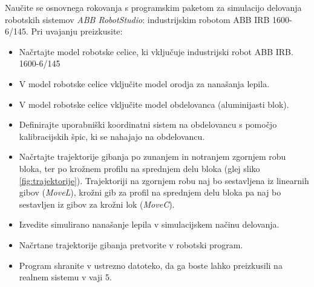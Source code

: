 Naučite se osnovnega rokovanja s programskim paketom za simulacijo delovanja
robotskih sistemov \emph{ABB RobotStudio}: industrijskim robotom ABB IRB
1600-6/145. Pri uvajanju preizkusite:
\begin{itemize}
\item\vspace*{-0.25cm} Načrtajte model robotske celice, ki vključuje industrijski robot ABB IRB.
1600-6/145

\item\vspace*{-0.25cm} V model robotske celice vključite model
orodja za nanašanja lepila.

\item\vspace*{-0.25cm} V model robotske celice vključite model
obdelovanca (aluminijasti blok).

\item\vspace*{-0.25cm} Definirajte uporabniški koordinatni sistem na obdelovancu s pomočjo kalibracijskih špic, ki se nahajajo na obdelovancu.

\item\vspace*{-0.25cm} Načrtajte trajektorije gibanja po zunanjem in notranjem zgornjem robu bloka, ter po krožnem profilu na sprednjem delu bloka (glej sliko \ref{fig:trajektorije}). Trajektoriji na zgornjem robu naj bo sestavljena iz linearnih gibov (\emph{MoveL}), krožni gib za profil na sprednjem delu bloka pa naj bo sestavljen iz gibov za krožni lok (\emph{MoveC}). 

\item\vspace*{-0.25cm} Izvedite simulirano nanašanje lepila v simulacijskem načinu
delovanja.

\item\vspace*{-0.25cm} Načrtane trajektorije gibanja pretvorite v robotski
program.

\item\vspace*{-0.25cm} Program shranite v ustrezno datoteko, da ga boste lahko preizkusili
na realnem sistemu v vaji 5.
\end{itemize}



%

\label{Prazna stran} 